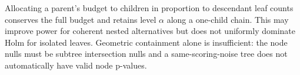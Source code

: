 Allocating a parent's budget to children in proportion to descendant leaf
counts conserves the full budget and retains level $\alpha$ along a one-child
chain.  This may improve power for coherent nested alternatives but does not
uniformly dominate Holm for isolated leaves.  Geometric containment alone is
insufficient: the node nulls must be subtree intersection nulls and a
same-scoring-noise tree does not automatically have valid node p-values.
